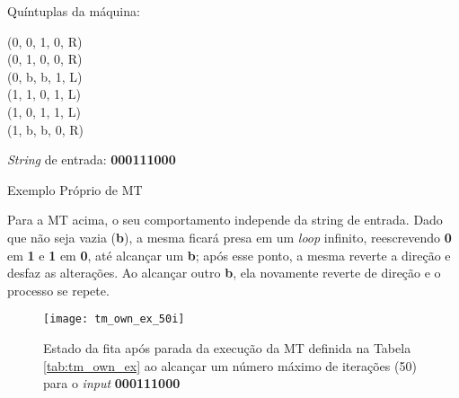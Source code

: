\begin{table}[H]
    \begin{minipage}{0.6\linewidth}

        \begin{minipage}{0.55\linewidth}
                Quíntuplas da máquina:
        \end{minipage}%
        \begin{minipage}{0.45\linewidth}
            \ttfamily
            (0, 0, 1, 0, R) \\
            (0, 1, 0, 0, R) \\
            (0, b, b, 1, L) \\
            (1, 1, 0, 1, L) \\
            (1, 0, 1, 1, L) \\
            (1, b, b, 0, R)
        \end{minipage}

    \end{minipage}%
    \begin{minipage}{0.4\linewidth}

        \begin{flushright}
            \textit{String} de entrada: \textbf{000111000}
        \end{flushright}

    \end{minipage}

    \caption{Exemplo Próprio de MT}
    \label{tab:tm_own_ex}
\end{table}

Para a MT acima, o seu comportamento independe da string de entrada. Dado que
não seja vazia (\textbf{b}), a mesma ficará presa em um \textit{loop} infinito,
reescrevendo \textbf{0} em \textbf{1} e \textbf{1} em \textbf{0}, até alcançar
um \textbf{b}; após esse ponto, a mesma reverte a direção e desfaz as
alterações. Ao alcançar outro \textbf{b}, ela novamente reverte de direção e
o processo se repete.

\begin{figure}[H]
    \centering
    \texttt{[image: tm\_own\_ex\_50i]}
    \caption{
        Estado da fita após parada da execução da MT definida na
        Tabela \ref{tab:tm_own_ex} ao alcançar um número máximo de iterações
        (50) para o \textit{input} \textbf{000111000}
    }
    \label{fig:tm_own_ex_50i}
\end{figure}